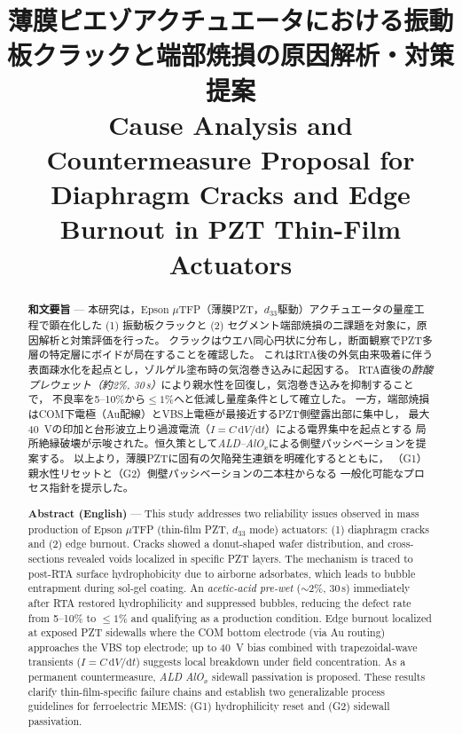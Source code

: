 \documentclass[conference]{IEEEtran}
\title{%
  薄膜ピエゾアクチュエータにおける振動板クラックと端部焼損の原因解析・対策提案\\
  \large Cause Analysis and Countermeasure Proposal for Diaphragm Cracks and Edge Burnout in PZT Thin-Film Actuators
}
\author{%
  \IEEEauthorblockN{三溝 真一 (Shinichi Samizo)}%
  \IEEEauthorblockA{独立系半導体研究者（元セイコーエプソン） / Independent Semiconductor Researcher (ex-Seiko Epson)\\%
  Email: \href{mailto:shin3t72@gmail.com}{shin3t72@gmail.com}\quad
  GitHub: \url{https://github.com/Samizo-AITL}}%
}
\begin{document}
\maketitle


\begin{abstract}
\textbf{和文要旨} —
本研究は，Epson $\mu$TFP（薄膜PZT，$d_{33}$駆動）アクチュエータの量産工程で顕在化した
(1) 振動板クラックと (2) セグメント端部焼損の二課題を対象に，原因解析と対策評価を行った。
クラックはウエハ同心円状に分布し，断面観察でPZT多層の特定層にボイドが局在することを確認した。
これはRTA後の外気由来吸着に伴う表面疎水化を起点とし，ゾルゲル塗布時の気泡巻き込みに起因する。
RTA直後の\emph{酢酸プレウェット（約2\%, 30\,s）}により親水性を回復し，気泡巻き込みを抑制することで，
不良率を5–10\%から\(\le\!1\%\)へと低減し量産条件として確立した。
一方，端部焼損はCOM下電極（Au配線）とVBS上電極が最接近するPZT側壁露出部に集中し，
最大\SI{40}{V}の印加と台形波立上り過渡電流（$I=C\,\mathrm{d}V/\mathrm{d}t$）による電界集中を起点とする
局所絶縁破壊が示唆された。恒久策として\emph{ALD–AlO$_x$}による側壁パッシベーションを提案する。
以上より，薄膜PZTに固有の欠陥発生連鎖を明確化するとともに，
（G1）親水性リセットと（G2）側壁パッシベーションの二本柱からなる
一般化可能なプロセス指針を提示した。

\medskip
\textbf{Abstract (English)} —
This study addresses two reliability issues observed in mass production of Epson $\mu$TFP
(thin-film PZT, $d_{33}$ mode) actuators: (1) diaphragm cracks and (2) edge burnout.
Cracks showed a donut-shaped wafer distribution, and cross-sections revealed voids localized in
specific PZT layers. The mechanism is traced to post-RTA surface hydrophobicity due to airborne
adsorbates, which leads to bubble entrapment during sol-gel coating. An \emph{acetic-acid pre-wet}
($\sim$2\%, 30\,s) immediately after RTA restored hydrophilicity and suppressed bubbles,
reducing the defect rate from 5–10\% to \(\le\!1\%\) and qualifying as a production condition.
Edge burnout localized at exposed PZT sidewalls where the COM bottom electrode (via Au routing)
approaches the VBS top electrode; up to \SI{40}{V} bias combined with trapezoidal-wave transients
($I=C\,\mathrm{d}V/\mathrm{d}t$) suggests local breakdown under field concentration.
As a permanent countermeasure, \emph{ALD AlO$_x$} sidewall passivation is proposed.
These results clarify thin-film-specific failure chains and establish two generalizable process
guidelines for ferroelectric MEMS: (G1) hydrophilicity reset and (G2) sidewall passivation.
\end{abstract}
\end{document}
